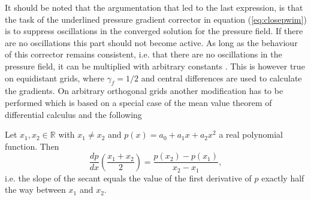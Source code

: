   It should be noted that the argumentation that led to the last expression, is that the task of the underlined pressure gradient corrector in equation (\ref{eq:closepwim}) is to suppress oscillations in the converged solution for the pressure field. If there are no oscillations this part should not become active. As long as the behaviour of this corrector remains consistent, i.e. that there are no oscillations in the pressure field, it can be multiplied with arbitrary constants \cite{ferziger02}. This is however true on equidistant grids, where \(\gamma_f = 1/2\) and central differences are used to calculate the gradients. On arbitrary orthogonal grids another modification has to be performed which is based on a special case of the mean value theorem of differential calculus and the following 
\begin{prop}
  Let \(x_1,x_2 \in \mathbb{R}\) with \(x_1 \neq x_2\) and \(p(x) = a_0 + a_1 x + a_2 x^2\) a real polynomial function. Then 
  \begin{displaymath}
    \frac{dp}{dx}\left(\frac{x_1+x_2}{2}\right) = \frac{p(x_2) - p(x_1)}{x_2 - x_1},
  \end{displaymath}
  i.e. the slope of the secant equals the value of the first derivative of \(p\) exactly half the way between \(x_1\) and \(x_2\).
\end{prop}

